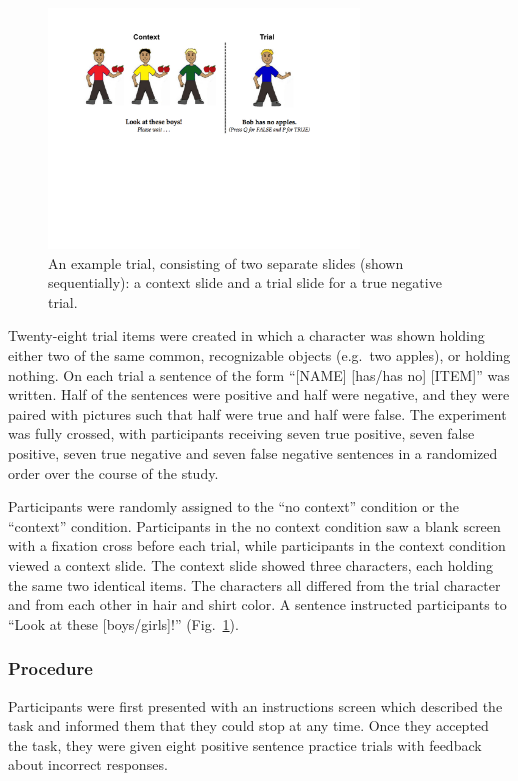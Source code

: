 \documentclass[10pt,letterpaper]{article}
\begin{document}
\begin{figure}[t]
\begin{center} 
\includegraphics[width=3.25in]{figures/negatron_trialfig2.pdf}
\caption{\label{fig:trial} An example trial, consisting of two separate slides (shown sequentially): a context slide and a trial slide for a true negative trial. }
\vspace{-5mm}
\end{center} 
\end{figure}

Twenty-eight trial items were created in which a character was shown holding either two of the same common, recognizable objects (e.g.\ two apples), or holding nothing.  On each trial a sentence of the form ``[NAME] [has/has no] [ITEM]'' was written.  Half of the sentences were positive and half were negative, and they were paired with pictures such that half were true and half were false.  The experiment was fully crossed, with participants receiving seven true positive, seven false positive, seven true negative and seven false negative sentences in a randomized order over the course of the study.  

Participants were randomly assigned to the ``no context'' condition or the ``context'' condition.  Participants in the no context condition saw a blank screen with a fixation cross before each trial, while participants in the context condition viewed a context slide.  The context slide showed three characters, each holding the same two identical items.  The characters all differed from the trial character and from each other in hair and shirt color.  A sentence instructed participants to ``Look at these [boys/girls]!'' (Fig.\ \ref{fig:trial}).  


\subsubsection{Procedure}
Participants were first presented with an instructions screen which described the task and informed them that they could stop at any time.  Once they accepted the task, they were given eight positive sentence practice trials with feedback about incorrect responses. 
\end{document}
